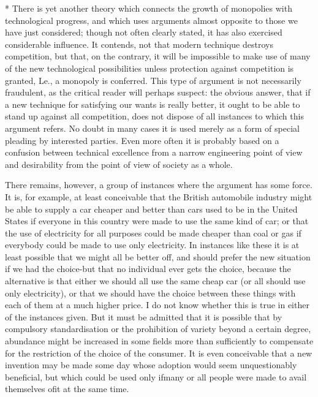 \documentclass[11pt,openany]{book}
\begin{document}
* There is yet another theory which connects the growth of monopolies with technological progress, and which uses arguments almost opposite to those we have just considered; though not often clearly stated, it has also exercised considerable influence. It contends, not that modern technique destroys competition, but that, on the contrary, it will be impossible to make use of many of the new technological possibilities unless protection against competition is granted, Le., a monopoly is conferred. This type of argument is not necessarily fraudulent, as the critical reader will perhaps suspect: the obvious answer, that if a new technique for satisfying our wants is really better, it ought to be able to stand up against all competition, does not dispose of all instances to which this argument refers. No doubt in many cases it is used merely as a form of special pleading by interested parties. Even more often it is probably based on a confusion between technical excellence from a narrow engineering point of view and desirability from the point of view of society as a whole.

There remains, however, a group of instances where the argument has some force. It is, for example, at least conceivable that the British automobile industry might be able to supply a car cheaper and better than cars used to be in the United States if everyone in this country were made to use the same kind of car; or that the use of electricity for all purposes could be made cheaper than coal or gas if everybody could be made to use only electricity. In instances like these it is at least possible that we might all be better off, and should prefer the new situation if we had the choice-but that no individual ever gets the choice, because the alternative is that either we should all use the same cheap car (or all should use only electricity), or that we should have the choice between these things with each of them at a much higher price. I do not know whether this is true in either of the instances given. But it must be admitted that it is possible that by compulsory standardisation or the prohibition of variety beyond a certain degree, abundance might be increased in some fields more than sufficiently to compensate for the restriction of the choice of the consumer. It is even conceivable that a new invention may be made some day whose adoption would seem unquestionably beneficial, but which could be used only ifmany or all people were made to avail themselves ofit at the same time.
\end{document}
